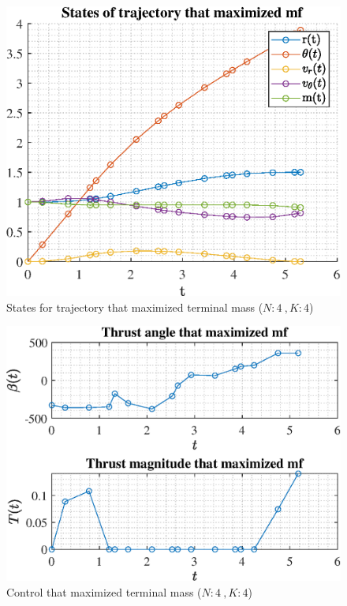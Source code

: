 \documentclass[]{article}
\begin{document}
	\begin{figure}
		\centering
		\includegraphics[scale=0.75]{states_N4_K4_C2_mf.eps}
		\caption{States for trajectory that maximized terminal mass (\(N:4\ , K:4\))}
		\label{fig:states_N4_K4_C2_mf}
	\end{figure}
	\begin{figure}
		\centering
		\includegraphics[scale=0.75]{control_N4_K4_C2_mf.eps}
		\caption{Control that maximized terminal mass (\(N:4\ , K:4\))}
		\label{fig:control_N4_K4_C2_mf}
	\end{figure}
\end{document}
